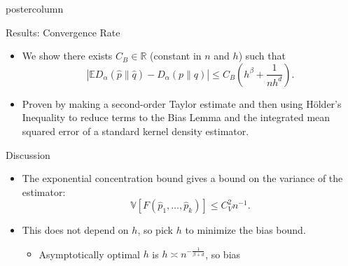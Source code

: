 \documentclass[final,hyperref={pdfpagelabels=false}]{beamer}
\newcommand{\inv}{^{-1}}
\newcommand{\E}{\mathbb{E}}
\newcommand{\R}{\mathbb{R}}
\newlength{\columnheight}
\begin{document}
\begin{frame}
\begin{columns}
    \begin{column}{.32\textwidth}
      \begin{beamercolorbox}[center,wd=\textwidth]{postercolumn}
        \begin{minipage}[T]{.95\textwidth} %
          \parbox[t][\columnheight]{\textwidth}{ %
            \vfill
            \begin{block}{Results: Convergence Rate}
              \begin{itemize}
              \item We show there exists $C_B \in \R$ (constant in $n$ and $h$)
                    such that
                    \[|\E D_\alpha(\hat p\|\hat q) - D_\alpha(p\|q)|
                    \leq C_B\left( h^\beta + \frac{1}{nh^d} \right).\]
              \item Proven by making a second-order Taylor estimate and then
                    using H\"older's Inequality to reduce terms to the Bias
                    Lemma and the integrated mean squared error of a standard
                    kernel density estimator.
              \end{itemize}
            \end{block}
            \vfill
            \begin{block}{Discussion}
                  \begin{itemize}
                  \item The exponential concentration bound gives a bound on
                        the variance of the estimator:
                        \vspace{-5mm}
                        \[\mathbb{V}[F(\hat p_1,\dots,\hat p_k)]
                                                    \leq C_V^2n\inv.\]
                  \item This does not depend on $h$, so pick $h$ to minimize
                        the bias bound.
                        \begin{itemize}
                        \item Asymptotically optimal $h$ is
                              $h \asymp n^{-\frac{1}{\beta + d}}$, so bias

\end{itemize}
\end{itemize}
\end{block}}
\end{minipage}
\end{beamercolorbox}
\end{column}
\end{columns}
\end{frame}
\end{document}
